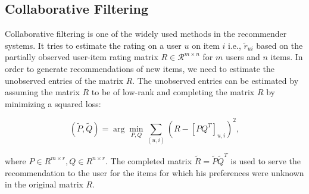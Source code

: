 
\subsection{Collaborative Filtering}

Collaborative filtering is one of the widely used methods in the recommender
systems. It tries to estimate the rating on a user $u$ on item $i$ i.e.,
$\tilde{r}_{ui}$  based on the  partially observed user-item rating matrix $R
\in \mathcal{R}^{m \times n}$ for $m$ users and $n$ items. In order to generate
recommendations of new items, we need to estimate the unobserved entries of the
matrix $R$. The unobserved entries can be estimated by assuming the matrix $R$
to be of low-rank and completing the matrix $R$ by minimizing a squared loss:


\begin{equation}
  (\tilde{P}, \tilde{Q}) = \arg \min_{P,Q} \sum_{(u,i)} ( R - [PQ^T]_{u,i})^2,
\end{equation}

where $P \in R^{m \times r}, Q \in R^{n \times r}$. The completed matrix
$\tilde{R} = \tilde{P} \tilde{Q}^T$
is used to serve the recommendation to the user for the items for which his
preferences were unknown in the original matrix $R$.






